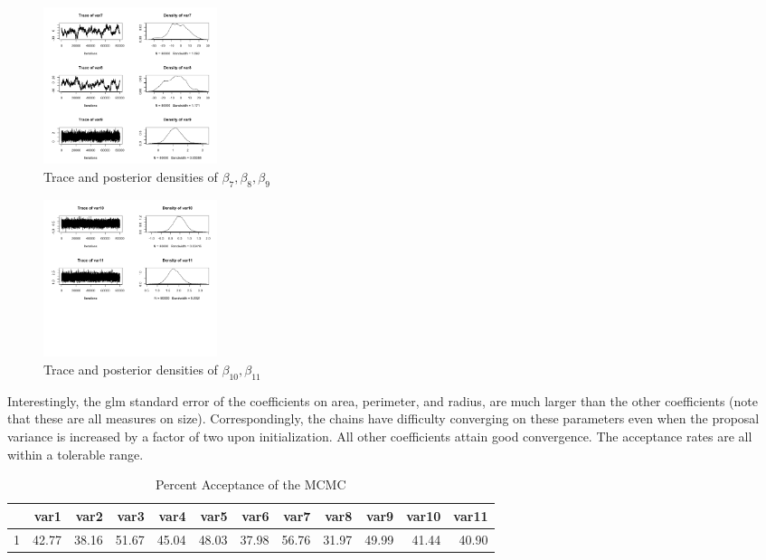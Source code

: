 \documentclass[11pt]{amsart}
\begin{document}
 \begin{figure}[htbp] %
   \centering
   \includegraphics[width=2in]{BayesLogit/real_trace_7_9.png} 
   \caption{Trace and posterior densities of $\beta_7, \beta_8, \beta_9$}
\end{figure}

 \begin{figure}[htbp] %
   \centering
   \includegraphics[width=2in]{BayesLogit/real_trace_10_11.png} 
   \caption{Trace and posterior densities of $\beta_{10}, \beta_{11}$}
\end{figure}

Interestingly, the glm standard error of the coefficients on area, perimeter, and radius, are much larger than the other coefficients (note that these are all measures on size). Correspondingly, the chains have difficulty converging on these parameters even when the proposal variance is increased by a factor of two upon initialization.  All other coefficients attain good convergence. The acceptance rates are all within a tolerable range. 

\begin{table}[ht]
\centering
\caption{Percent Acceptance of the MCMC}
\begin{tabular}{rrrrrrrrrrrr}
  \hline
 & var1 & var2 & var3 & var4 & var5 & var6 & var7 & var8 & var9 & var10 & var11 \\ 
  \hline
1 & 42.77 & 38.16 & 51.67 & 45.04 & 48.03 & 37.98 & 56.76 & 31.97 & 49.99 & 41.44 & 40.90 \\ 
   \hline
\end{tabular}
\end{table}
\end{document}
